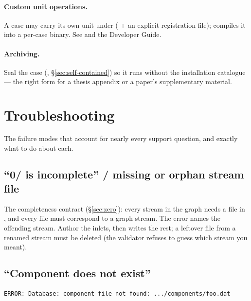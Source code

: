 \documentclass[11pt,a4paper]{article}
\begin{document}
\paragraph{Custom unit operations.}  A case may carry its own \cpp{}
unit under  ( + an explicit
registration file);  compiles it into a per-case
binary.  See
and the Developer Guide.

\paragraph{Archiving.}  Seal the case
(, \S\ref{sec:self-contained}) so it runs
without the installation catalogue --- the right form for a thesis
appendix or a paper's supplementary material.

\section{Troubleshooting}\label{sec:troubleshoot}

\begin{whatyoulllearn}
The failure modes that account for nearly every support question, and
exactly what to do about each.
\end{whatyoulllearn}

\subsection*{``0/ is incomplete'' / missing or orphan stream file}

The completeness contract (\S\ref{sec:zero}): every stream in the graph
needs a file in , and every file must correspond to a graph
stream.  The error names the offending stream.  Author the inlets, then
 writes the rest; a leftover file from a
renamed stream must be deleted (the validator refuses to guess which
stream you meant).

\subsection*{``Component does not exist''}

\begin{lstlisting}
ERROR: Database: component file not found: .../components/foo.dat
\end{lstlisting}
\end{document}
